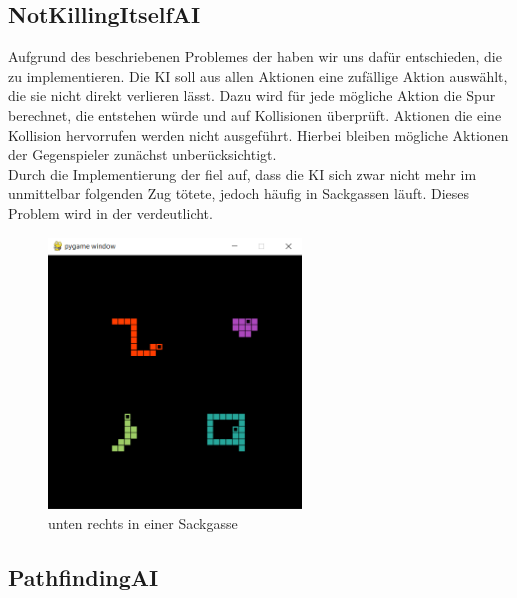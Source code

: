 \subsection{NotKillingItselfAI}
\label{subsec:notkillingitself-ai}

Aufgrund des beschriebenen Problemes der  haben wir uns dafür entschieden, die 
zu implementieren.
Die \ac{KI} soll aus allen Aktionen eine zufällige Aktion auswählt, die sie nicht direkt verlieren lässt.
Dazu wird für jede mögliche Aktion die Spur berechnet, die entstehen würde und auf Kollisionen überprüft.
Aktionen die eine Kollision hervorrufen werden nicht ausgeführt.
Hierbei bleiben mögliche Aktionen der Gegenspieler zunächst unberücksichtigt. \\

Durch die Implementierung der  fiel auf, dass die \ac{KI} sich zwar nicht mehr im unmittelbar
folgenden Zug tötete, jedoch häufig in Sackgassen läuft.
Dieses Problem wird in der  verdeutlicht.

\begin{figure}[htb]
    \centering
    \includegraphics[width=0.6\textwidth]{Bilder/Sackgassen_Problem.png}
    \caption{ unten rechts in einer Sackgasse}
    \label{fig:Sackgassen_Problem}
\end{figure}

\subsection{PathfindingAI}
\label{subsec:pathfinding-ai}

